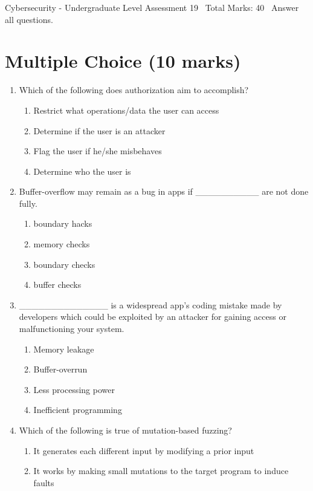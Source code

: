\documentclass[12pt]{article}
\begin{document}
\begin{center}
Cybersecurity - Undergraduate Level Assessment 19 \
Total Marks: 40 \
Answer all questions.
\end{center}

\section*{Multiple Choice (10 marks)}
\begin{enumerate}[label=\arabic*.]
\item Which of the following does authorization aim to accomplish?
\begin{enumerate}[label=(\alph*)]
    \item Restrict what operations/data the user can access
    \item Determine if the user is an attacker
    \item Flag the user if he/she misbehaves
    \item Determine who the user is
\end{enumerate}
\item Buffer-overflow may remain as a bug in apps if \_\_\_\_\_\_\_\_\_\_ are not done fully.
\begin{enumerate}[label=(\alph*)]
    \item boundary hacks
    \item memory checks
    \item boundary checks
    \item buffer checks
\end{enumerate}
\item \_\_\_\_\_\_\_\_\_\_\_\_\_\_ is a widespread app's coding mistake made by developers which could be exploited by an attacker for gaining access or malfunctioning your system.
\begin{enumerate}[label=(\alph*)]
    \item Memory leakage
    \item Buffer-overrun
    \item Less processing power
    \item Inefficient programming
\end{enumerate}
\item Which of the following is true of mutation-based fuzzing?
\begin{enumerate}[label=(\alph*)]
    \item It generates each different input by modifying a prior input
    \item It works by making small mutations to the target program to induce faults

\end{enumerate}
\end{enumerate}
\end{document}
